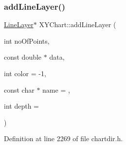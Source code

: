\subsubsection{\texorpdfstring{add\+Line\+Layer()}{addLineLayer()}\hspace{0.1cm}{\footnotesize\ttfamily [1/3]}}
{\footnotesize\ttfamily \hyperlink{class_line_layer}{Line\+Layer}$\ast$ X\+Y\+Chart\+::add\+Line\+Layer (\begin{DoxyParamCaption}\item[{int}]{no\+Of\+Points,  }\item[{const double $\ast$}]{data,  }\item[{int}]{color = {\ttfamily -\/1},  }\item[{const char $\ast$}]{name = {},  }\item[{int}]{depth = {} }\end{DoxyParamCaption})\hspace{0.3cm}{\ttfamily [inline]}}



Definition at line 2269 of file chartdir.\+h.

